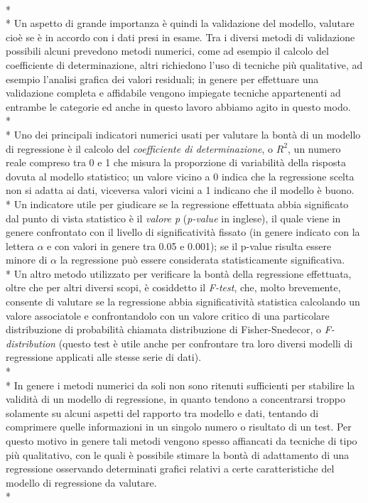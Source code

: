 \documentclass[12pt,a4paper,openright,twoside]{report}
\begin{document}
\\*\\*
Un aspetto di grande importanza è quindi la validazione del modello, valutare cioè se è in accordo con i dati presi in esame. Tra i diversi metodi di validazione possibili alcuni prevedono metodi numerici, come ad esempio il calcolo del coefficiente di determinazione, altri richiedono l'uso di tecniche più qualitative, ad esempio l'analisi grafica dei valori residuali; in genere per effettuare una validazione completa e affidabile vengono impiegate tecniche appartenenti ad entrambe le categorie ed anche in questo lavoro abbiamo agito in questo modo.\\*\\*
Uno dei principali indicatori numerici usati per valutare la bontà di un modello di regressione è il calcolo del \emph{coefficiente di determinazione}, o $R^2$, un numero reale compreso tra 0 e 1 che misura la proporzione di variabilità della risposta dovuta al modello statistico; un valore vicino a 0 indica che la regressione scelta non si adatta ai dati, viceversa valori vicini a 1 indicano che il modello è buono. \\*
Un indicatore utile per giudicare se la regressione effettuata abbia significato dal punto di vista statistico è il  \emph{valore p} (\emph{p-value} in inglese), il quale viene in genere confrontato con il livello di significatività fissato (in genere indicato con la lettera $\alpha$ e con valori in genere tra 0.05 e 0.001); se il p-value risulta essere minore di $\alpha$ la regressione può essere considerata statisticamente significativa.\\*
Un altro metodo utilizzato per verificare la bontà della regressione effettuata, oltre che per altri diversi scopi, è cosiddetto il \emph{F-test}, che, molto brevemente, consente di valutare se la regressione abbia significatività statistica calcolando un valore associatole e confrontandolo con un valore critico di una particolare distribuzione di probabilità chiamata  distribuzione di Fisher-Snedecor, o \emph{F-distribution} (questo test è utile anche per confrontare tra loro diversi modelli di regressione applicati alle stesse serie di dati).\\*\\*
In genere i metodi numerici da soli non sono ritenuti sufficienti per stabilire la validità di un modello di regressione, in quanto tendono a concentrarsi troppo solamente su alcuni aspetti del rapporto tra modello e dati, tentando di comprimere quelle informazioni in un singolo numero o risultato di un test. Per questo motivo in genere  tali metodi vengono spesso affiancati da tecniche di tipo più qualitativo, con le quali è possibile stimare la bontà di adattamento di una regressione osservando determinati grafici relativi a certe caratteristiche del modello di regressione da valutare.\\*
\end{document}
